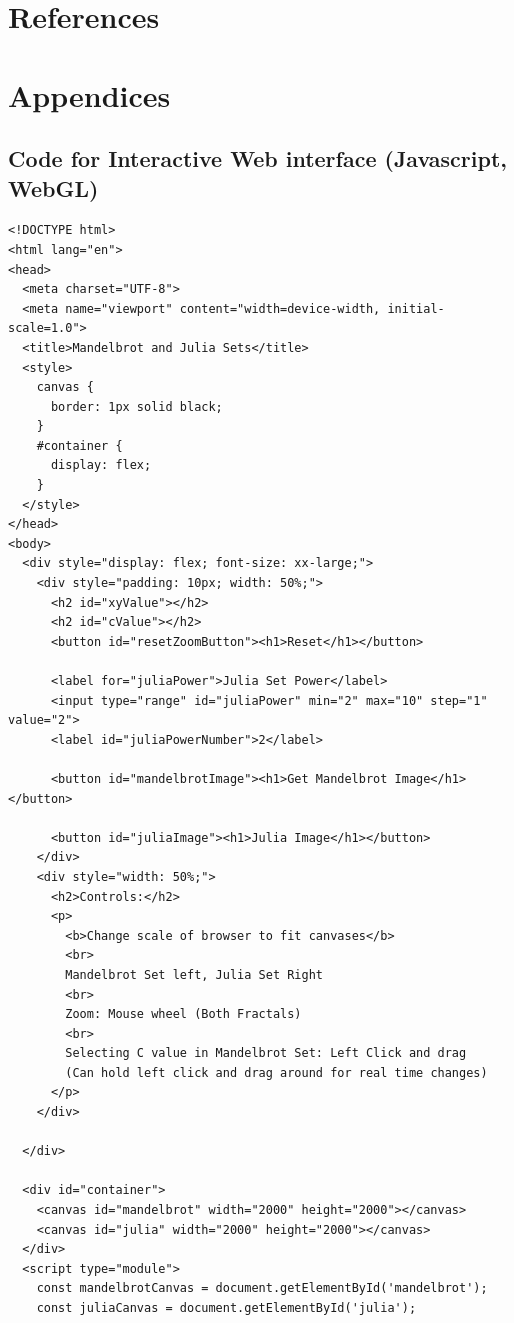 \documentclass[12pt,a4paper]{report}
\begin{document}
\section{References}
\newpage


\section{Appendices}


\subsection{Code for Interactive Web interface (Javascript, WebGL)}

\begin{verbatim}
<!DOCTYPE html>
<html lang="en">
<head>
  <meta charset="UTF-8">
  <meta name="viewport" content="width=device-width, initial-scale=1.0">
  <title>Mandelbrot and Julia Sets</title>
  <style>
    canvas {
      border: 1px solid black;
    }
    #container {
      display: flex;
    }
  </style>
</head>
<body>
  <div style="display: flex; font-size: xx-large;">
    <div style="padding: 10px; width: 50%;">
      <h2 id="xyValue"></h2>
      <h2 id="cValue"></h2>
      <button id="resetZoomButton"><h1>Reset</h1></button>
  
      <label for="juliaPower">Julia Set Power</label>
      <input type="range" id="juliaPower" min="2" max="10" step="1" value="2">
      <label id="juliaPowerNumber">2</label>
      
      <button id="mandelbrotImage"><h1>Get Mandelbrot Image</h1></button>

      <button id="juliaImage"><h1>Julia Image</h1></button>
    </div>
    <div style="width: 50%;">
      <h2>Controls:</h2>
      <p>
        <b>Change scale of browser to fit canvases</b>
        <br>
        Mandelbrot Set left, Julia Set Right
        <br>
        Zoom: Mouse wheel (Both Fractals)
        <br>
        Selecting C value in Mandelbrot Set: Left Click and drag 
        (Can hold left click and drag around for real time changes)
      </p>
    </div>

  </div>

  <div id="container">
    <canvas id="mandelbrot" width="2000" height="2000"></canvas>
    <canvas id="julia" width="2000" height="2000"></canvas>
  </div>
  <script type="module">
    const mandelbrotCanvas = document.getElementById('mandelbrot');
    const juliaCanvas = document.getElementById('julia');


\end{verbatim}
\end{document}
